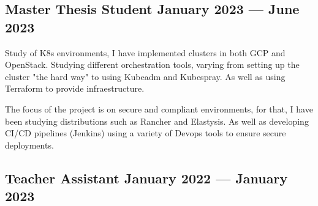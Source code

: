 \documentclass[letter,10pt]{article}
\begin{document}









\subsection{{Master Thesis Student \hfill January 2023 --- June 2023}}

\begin{zitemize}
\item Study of K8s environments, I have implemented clusters in both GCP and OpenStack. Studying different orchestration tools, varying from setting up the cluster "the hard way" to using Kubeadm and Kubespray. As well as using Terraform to provide infraestructure.

\item The focus of the project is on secure and compliant environments, for that, I have been studying distributions such as Rancher and Elastysis. As well as developing CI/CD pipelines (Jenkins) using a variety of Devops tools to ensure secure deployments.
\end{zitemize}

\subsection{{Teacher Assistant \hfill January 2022 --- January 2023}}
\end{document}
